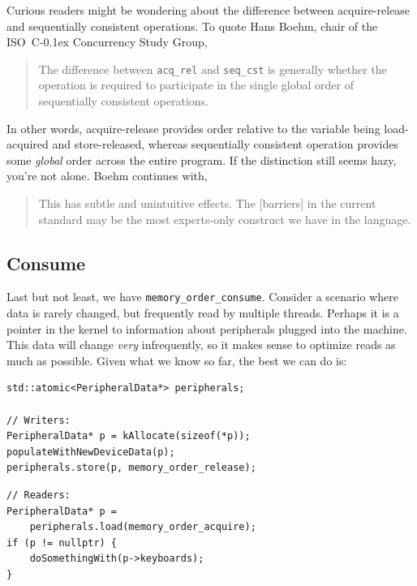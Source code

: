 \documentclass[fontsize=10pt, numbers=endperiod]{scrartcl}
\newcommand{\codesize}{\fontsize{10pt}{12pt}}
\newcommand{\cpp}[1]{C\kern-0.1ex\raisebox{0.15ex}{\texttt{++}}{\addfontfeature{Numbers=LowercaseOff}#1}}
\newenvironment{colfigure}
  {\par\vspace{1\baselineskip minus 0.5\baselineskip}\noindent\minipage{\linewidth}}
  {\endminipage\vspace*{1\baselineskip minus 0.7\baselineskip}}
\begin{document}
\begin{multicols}{2}
Curious readers might be wondering about the difference between
acquire-release and sequentially consistent operations.
To quote Hans Boehm, chair of the ISO~\cpp{} Concurrency Study Group,
\begin{quote}
\small
The difference between \texttt{acq\_rel} and \texttt{seq\_cst} is generally
whether the operation is required to participate in the
single global order of sequentially consistent operations.
\end{quote}
In other words, acquire-release provides order relative to the variable
being load-acquired and store-released, whereas sequentially consistent
operation provides some \emph{global} order across the entire program.
If the distinction still seems hazy, you're not alone.
Boehm continues with,
\begin{quote}
\small
This has subtle and unintuitive effects.
The [barriers] in the current standard may be the most
experts-only construct we have in the language.
\end{quote}

\subsection{Consume}

Last but not least, we have \texttt{memory\_order\_consume}.
Consider a scenario where data is rarely changed,
but frequently read by multiple threads.
Perhaps it is a pointer in the kernel to information about peripherals
plugged into the machine.
This data will change \emph{very} infrequently,
so it makes sense to optimize reads as much as possible.
Given what we know so far, the best we can do is:
\begin{colfigure}
\begin{verbatim}
std::atomic<PeripheralData*> peripherals;

// Writers:
PeripheralData* p = kAllocate(sizeof(*p));
populateWithNewDeviceData(p);
peripherals.store(p, memory_order_release);
\end{verbatim}
\begin{verbatim}
// Readers:
PeripheralData* p =
    peripherals.load(memory_order_acquire);
if (p != nullptr) {
    doSomethingWith(p->keyboards);
}
\end{verbatim}
\end{colfigure}


\end{multicols}
\end{document}
